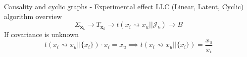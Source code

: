 \begin{frame}{Causality and cyclic graphs - Experimental effect}
LLC (Linear, Latent, Cyclic) algorithm overview
\begin{equation}
\Sigma_{\boldsymbol{x}_k}
\rightarrow
T_{\boldsymbol{x}_k}
\rightarrow
t(x_i \rightsquigarrow x_u || \mathcal{J}_k)
\rightarrow
B
\end{equation}
If covariance is unknown
\begin{equation}
\label{eq:t_regress}
t(x_i \rightsquigarrow x_u || \{x_i\}) \cdot x_i = x_u
\implies
t(x_i \rightsquigarrow x_u || \{x_i\}) = \frac{x_u}{x_i}
\end{equation}



\end{frame}

